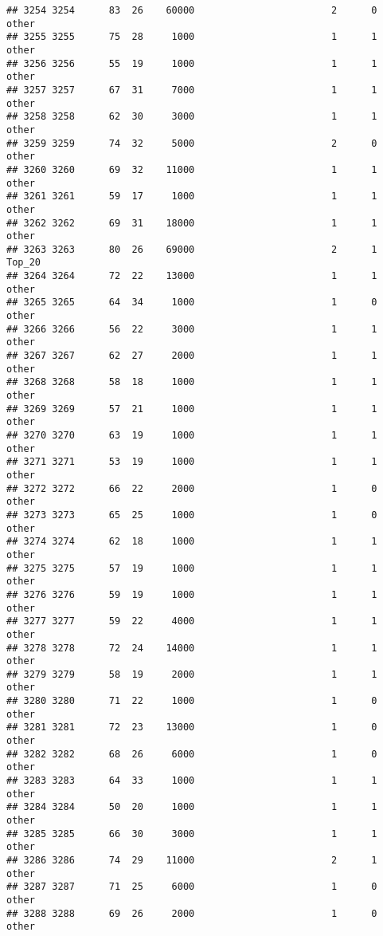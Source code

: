\documentclass[
]{article}
\begin{document}
\begin{verbatim}
## 3254 3254      83  26    60000                        2      0    other
## 3255 3255      75  28     1000                        1      1    other
## 3256 3256      55  19     1000                        1      1    other
## 3257 3257      67  31     7000                        1      1    other
## 3258 3258      62  30     3000                        1      1    other
## 3259 3259      74  32     5000                        2      0    other
## 3260 3260      69  32    11000                        1      1    other
## 3261 3261      59  17     1000                        1      1    other
## 3262 3262      69  31    18000                        1      1    other
## 3263 3263      80  26    69000                        2      1   Top_20
## 3264 3264      72  22    13000                        1      1    other
## 3265 3265      64  34     1000                        1      0    other
## 3266 3266      56  22     3000                        1      1    other
## 3267 3267      62  27     2000                        1      1    other
## 3268 3268      58  18     1000                        1      1    other
## 3269 3269      57  21     1000                        1      1    other
## 3270 3270      63  19     1000                        1      1    other
## 3271 3271      53  19     1000                        1      1    other
## 3272 3272      66  22     2000                        1      0    other
## 3273 3273      65  25     1000                        1      0    other
## 3274 3274      62  18     1000                        1      1    other
## 3275 3275      57  19     1000                        1      1    other
## 3276 3276      59  19     1000                        1      1    other
## 3277 3277      59  22     4000                        1      1    other
## 3278 3278      72  24    14000                        1      1    other
## 3279 3279      58  19     2000                        1      1    other
## 3280 3280      71  22     1000                        1      0    other
## 3281 3281      72  23    13000                        1      0    other
## 3282 3282      68  26     6000                        1      0    other
## 3283 3283      64  33     1000                        1      1    other
## 3284 3284      50  20     1000                        1      1    other
## 3285 3285      66  30     3000                        1      1    other
## 3286 3286      74  29    11000                        2      1    other
## 3287 3287      71  25     6000                        1      0    other
## 3288 3288      69  26     2000                        1      0    other

\end{verbatim}
\end{document}

